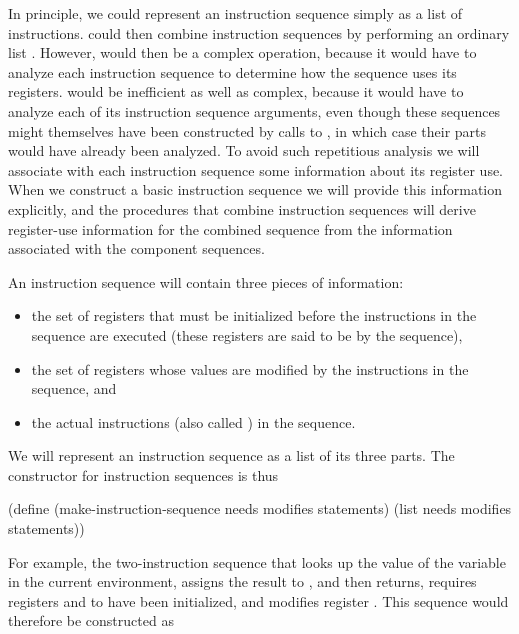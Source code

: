 In principle, we could represent an instruction sequence simply as a list of
instructions.   could then combine
instruction sequences by performing an ordinary list .  However,
 would then be a complex operation, because it would have to
analyze each instruction sequence to determine how the sequence uses its
registers.   would be inefficient as well as complex, because
it would have to analyze each of its instruction sequence arguments, even
though these sequences might themselves have been constructed by calls to
, in which case their parts would have already been analyzed.
To avoid such repetitious analysis we will associate with each instruction
sequence some information about its register use.  When we construct a basic
instruction sequence we will provide this information explicitly, and the
procedures that combine instruction sequences will derive register-use
information for the combined sequence from the information associated with the
component sequences.

An instruction sequence will contain three pieces of information:

\begin{itemize}
\item
the set of registers that must be initialized before the instructions in the
sequence are executed (these registers are said to be  by the
sequence),

\item
the set of registers whose values are modified by the instructions in the
sequence, and

\item
the actual instructions (also called ) in the sequence.
\end{itemize}

\noindent
We will represent an instruction sequence as a list of its three parts.  The
constructor for instruction sequences is thus

\begin{codeBlock}
(define (make-instruction-sequence
         needs modifies statements)
  (list needs modifies statements))
\end{codeBlock}

\noindent
For example, the two-instruction sequence that looks up the value of the
variable  in the current environment, assigns the result to ,
and then returns, requires registers  and  to have
been initialized, and modifies register .  This sequence would
therefore be constructed as

